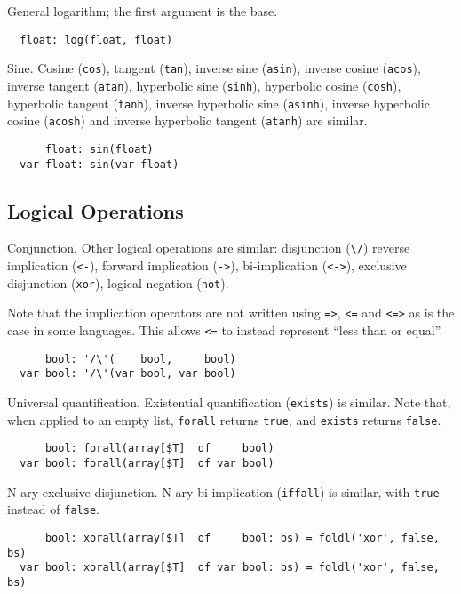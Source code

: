 \documentclass[10pt]{scrartcl}
\begin{document}
\builtin{}
General logarithm;  the first argument is the base.
\begin{verbatim}
  float: log(float, float)
\end{verbatim}

\builtin{}
Sine.  Cosine (\texttt{cos}), tangent (\texttt{tan}), inverse sine
(\texttt{asin}), inverse cosine (\texttt{acos}), inverse tangent
(\texttt{atan}), hyperbolic sine (\texttt{sinh}), hyperbolic cosine
(\texttt{cosh}), hyperbolic tangent (\texttt{tanh}),
inverse hyperbolic sine (\texttt{asinh}), inverse hyperbolic cosine
(\texttt{acosh}) and inverse hyperbolic tangent (\texttt{atanh}) are similar.
\begin{verbatim}
      float: sin(float)
  var float: sin(var float)
\end{verbatim}

\subsection{Logical Operations}
\builtin{}
Conjunction.  Other logical operations are similar:
disjunction (\verb+\/+)
reverse implication (\texttt{<-}),
forward implication (\texttt{->}),
bi-implication (\texttt{<->}),
exclusive disjunction (\texttt{xor}),
logical negation (\texttt{not}).

Note that the implication operators are not written
using \texttt{=>}, \texttt{<=} and \texttt{<=>} as is the case in some
languages.  This allows \texttt{<=} to instead represent ``less than or
equal''.
\begin{verbatim}
      bool: '/\'(    bool,     bool)
  var bool: '/\'(var bool, var bool)
\end{verbatim}

\builtin{}
Universal quantification.
Existential quantification (\texttt{exists}) is similar.  Note that, when
applied to an empty list, \texttt{forall} returns \texttt{true}, and
\texttt{exists} returns \texttt{false}.
\begin{verbatim}
      bool: forall(array[$T]  of     bool)
  var bool: forall(array[$T]  of var bool)
\end{verbatim}

\builtin{}
N-ary exclusive disjunction.
N-ary bi-implication (\texttt{iffall}) is similar, with \texttt{true} instead
of \texttt{false}.
\begin{verbatim}
      bool: xorall(array[$T]  of     bool: bs) = foldl('xor', false, bs)
  var bool: xorall(array[$T]  of var bool: bs) = foldl('xor', false, bs)
\end{verbatim}
\end{document}

